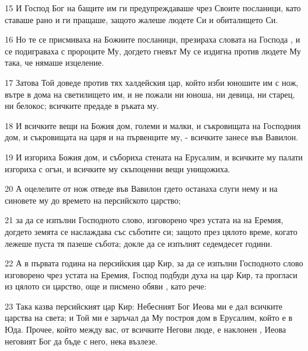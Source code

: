 \par 15 И Господ Бог на бащите им ги предупреждаваше чрез Своите посланици, като ставаше рано и ги пращаше, защото жалеше людете Си и обиталището Си.
\par 16 Но те се присмиваха на Божиите посланици, презираха словата на Господа , и се подиграваха с пророците Му, догдето гневът Му се издигна против людете Му така, че нямаше изцеление.
\par 17 Затова Той доведе против тях халдейския цар, който изби юношите им с нож, вътре в дома на светилището им, и не пожали ни юноша, ни девица, ни старец, ни белокос; всичките предаде в ръката му.
\par 18 И всичките вещи на Божия дом, големи и малки, и съкровищата на Господния дом, и съкровищата на царя и на първенците му, - всичките занесе във Вавилон.
\par 19 И изгориха Божия дом, и събориха стената на Ерусалим, и всичките му палати изгориха с огън, и всичките му скъпоценни вещи унищожиха.
\par 20 А оцелелите от нож отведе във Вавилон гдето останаха слуги нему и на синовете му до времето на персийското царство;
\par 21 за да се изпълни Господното слово, изговорено чрез устата на на Еремия, догдето земята се наслаждава със съботите си; защото през цялото време, когато лежеше пуста тя пазеше събота; докле да се изпълнят седемдесет години.
\par 22 А в първата година на персийския цар Кир, за да се изпълни Господното слово изговорено чрез устата на Еремия, Господ подбуди духа на цар Кир, та прогласи из цялото си царство, още и писмено обяви , като рече:
\par 23 Така казва персийският цар Кир: Небесният Бог Иеова ми е дал всичките царства на света; и Той ми е заръчал да Му построя дом в Ерусалим, който е в Юда. Прочее, който между вас, от всичките Негови люде, е наклонен , Иеова неговият Бог да бъде с него, нека възлезе.

